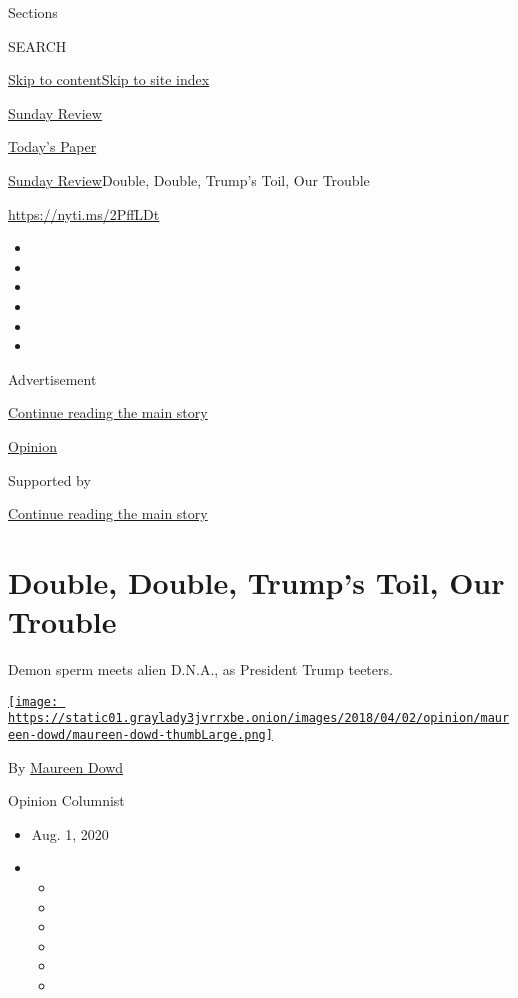 Sections

SEARCH

\protect\hyperlink{site-content}{Skip to
content}\protect\hyperlink{site-index}{Skip to site index}

\href{https://www.nytimes3xbfgragh.onion/section/opinion/sunday}{Sunday
Review}

\href{https://myaccount.nytimes3xbfgragh.onion/auth/login?response_type=cookie\&client_id=vi}{}

\href{https://www.nytimes3xbfgragh.onion/section/todayspaper}{Today's
Paper}

\href{/section/opinion/sunday}{Sunday Review}\textbar{}Double, Double,
Trump's Toil, Our Trouble

\url{https://nyti.ms/2PffLDt}

\begin{itemize}
\item
\item
\item
\item
\item
\item
\end{itemize}

Advertisement

\protect\hyperlink{after-top}{Continue reading the main story}

\href{/section/opinion}{Opinion}

Supported by

\protect\hyperlink{after-sponsor}{Continue reading the main story}

\hypertarget{double-double-trumps-toil-our-trouble}{%
\section{Double, Double, Trump's Toil, Our
Trouble}\label{double-double-trumps-toil-our-trouble}}

Demon sperm meets alien D.N.A., as President Trump teeters.

\href{https://www.nytimes3xbfgragh.onion/by/maureen-dowd}{\texttt{[image: https://static01.graylady3jvrrxbe.onion/images/2018/04/02/opinion/maureen-dowd/maureen-dowd-thumbLarge.png]}}

By \href{https://www.nytimes3xbfgragh.onion/by/maureen-dowd}{Maureen
Dowd}

Opinion Columnist

\begin{itemize}
\item
  Aug. 1, 2020
\item
  \begin{itemize}
  \item
  \item
  \item
  \item
  \item
  \item
  \end{itemize}
\end{itemize}

